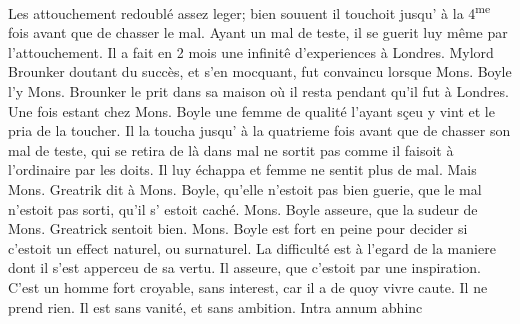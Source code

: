 Les 
attouchement redoubl\'{e} assez leger; bien souuent il touchoit jusqu' \`{a} la 4\textsuperscript{me} fois avant que de chasser le mal. Ayant un mal de teste, il se guerit luy m\^{e}me par l'attouchement. Il a fait en 2 mois une infinit\^{e} d'experiences \`{a} Londres.
Mylord Brounker\protect{}
doutant du succ\`{e}s, et s'en mocquant, fut convaincu lorsque Mons. Boyle\protect{} l'y
Mons. Brounker\protect{} le prit dans sa maison o\`{u} il resta pendant qu'il fut \`{a} Londres. Une fois estant chez Mons. Boyle\protect{} une femme de qualit\'{e} l'ayant s\c{c}eu y vint et le pria de la toucher. Il la toucha jusqu' \`{a} la quatrieme fois avant que de chasser son mal de teste, qui se retira
de l\`{a} dans
mal ne sortit pas comme il faisoit \`{a} l'ordinaire par les doits. Il luy \'{e}chappa et
femme ne sentit plus de mal.
Mais Mons. Greatrik\protect{} dit \`{a} Mons. Boyle\protect{}, qu'elle n'estoit pas bien guerie, que le mal n'estoit pas sorti, qu'il s' estoit cach\'{e}. Mons. Boyle\protect{} asseure, que la sudeur\protect{} de Mons. Greatrick\protect{} sentoit bien. Mons. Boyle\protect{} est fort en peine pour decider si c'estoit un effect naturel, ou surnaturel. La difficult\'{e} est \`{a} l'egard de la maniere dont il s'est apperceu de sa vertu. Il asseure, que c'estoit par une inspiration. C'est un homme fort croyable, sans interest, car il a de quoy vivre caute. Il ne prend rien. Il est sans vanit\'{e}, et sans ambition. Intra annum abhinc

